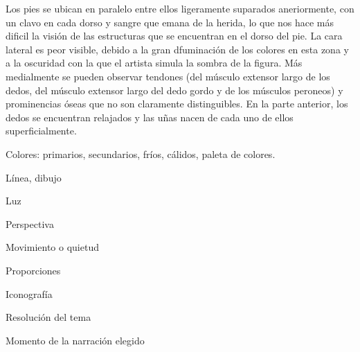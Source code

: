 Los pies se ubican en paralelo entre ellos ligeramente suparados aneriormente, con un clavo en cada dorso y sangre que emana de la herida, lo que nos hace más dificil la visión de las estructuras que se encuentran en el dorso del pie. La cara lateral es peor visible, debido a la gran dfuminación de los colores en esta zona y a la oscuridad con la que el artista simula la sombra de la figura. Más medialmente se pueden observar tendones (del músculo extensor largo de los dedos, del músculo extensor largo del dedo gordo y de los músculos peroneos) y prominencias óseas que no son claramente distinguibles. En la parte anterior, los dedos se encuentran relajados y las uñas nacen de cada uno de ellos superficialmente.




Colores: primarios, secundarios, fríos, cálidos, paleta de colores.

Línea, dibujo

Luz

Perspectiva

Movimiento o quietud

Proporciones

Iconografía

Resolución del tema

Momento de la narración elegido
